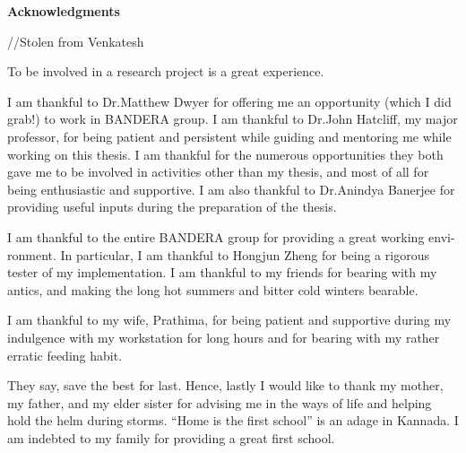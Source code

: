 
\newpage
\vspace*{0.9cm}
\begin{center}
{\bf \Huge Acknowledgments}
\end{center}

\setlength{\baselineskip}{0.8cm}



//Stolen from Venkatesh

To be involved in a research project is a great experience.

I am thankful to Dr.Matthew Dwyer for offering me an opportunity (which I did grab!) to work in BANDERA group. I am thankful to Dr.John Hatcliff, my major professor, for being patient and persistent while guiding and mentoring me while working on this thesis. I am thankful for the numerous opportunities they both gave me to be involved in activities other than my thesis, and most of all for being enthusiastic and supportive. I am also thankful to Dr.Anindya Banerjee for providing useful inputs during the preparation of the thesis.

I am thankful to the entire BANDERA group for providing a great working envi- ronment. In particular, I am thankful to Hongjun Zheng for being a rigorous tester of my implementation. I am thankful to my friends for bearing with my antics, and making the long hot summers and bitter cold winters bearable.

I am thankful to my wife, Prathima, for being patient and supportive during my indulgence with my workstation for long hours and for bearing with my rather erratic feeding habit.

They say, save the best for last. Hence, lastly I would like to thank my mother, my father, and my elder sister for advising me in the ways of life and helping hold the helm during storms. “Home is the first school” is an adage in Kannada. I am indebted to my family for providing a great first school.
